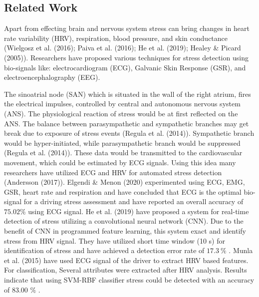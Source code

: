 \subsection{Related Work}

Apart from effecting brain and nervous system stress can bring changes in heart rate variability (HRV), respiration, blood pressure, and skin conductance (Wielgosz et al. (2016); Paiva et al. (2016); He et al. (2019); Healey \& Picard (2005)). Researchers have proposed various techniques for stress detection using bio-signals like: electrocardiogram (ECG), Galvanic Skin Response (GSR), and electroencephalography (EEG).

The sinoatrial node (SAN) which is situated in the wall of the right atrium, fires the electrical impulses, controlled by central and autonomous nervous system (ANS). The physiological reaction of stress would be at first reflected on the ANS. The balance between parasympathetic and sympathetic branches may get break due to exposure of stress events (Regula et al. (2014)). Sympathetic branch would be hyper-initiated, while parasympathetic branch would be suppressed (Regula et al. (2014)). These data would be transmitted to the cardiovascular movement, which could be estimated by ECG signals. Using this idea many researchers have utilized ECG and HRV for automated stress detection (Andersson (2017)). Elgendi \& Menon (2020) experimented using ECG, EMG, GSR, heart rate and respiration and have concluded that ECG is the optimal bio-signal for a driving stress assessment and have reported an overall accuracy of $75.02\%$ using ECG signal. He et al. (2019) have proposed a system for real-time detection of stress utilizing a convolutional neural network (CNN). Due to the benefit of CNN in programmed feature learning, this system exact and identify stress from HRV signal. They have utilized short time window (10 s) for identification of stress and have achieved a detection error rate of $17.3~\%$ . Munla et al. (2015) have used ECG signal of the driver to extract HRV based features. For classification, Several attributes were extracted after HRV analysis. Results indicate that using SVM-RBF classifier stress could be detected with an accuracy of 83.00 $\%$ .

